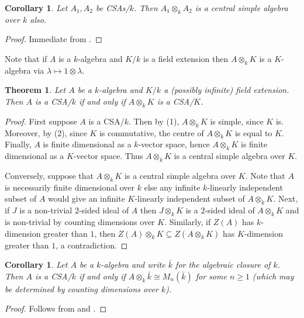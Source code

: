 \documentclass[11pt]{amsart}
\numberwithin{equation}{section}
\newtheorem{theorem}[equation]{Theorem}
\newtheorem{cor}[equation]{Corollary}
\theoremstyle{remark}
\theoremstyle{remark}
\theoremstyle{remark}
\theoremstyle{definition}
\theoremstyle{definition}
\theoremstyle{definition}
\theoremstyle{definition}
\theoremstyle{definition}
\theoremstyle{definition}
\begin{document}
\begin{cor}
Let $A_1,A_2$ be CSAs/$k$. Then $A_1\otimes_k A_2$ is a central simple algebra over $k$ also.
\end{cor}

\begin{proof}
Immediate from .
\end{proof}

Note that if $A$ is a $k$-algebra and $K/k$ is a field extension then $A\otimes_k K$ is a $K$-algebra via $\lambda \mapsto 1\otimes \lambda$.

\begin{theorem} \label{twists of matrix algebra}
Let $A$ be a $k$-algebra and $K/k$ a (possibly infinite) field extension. Then $A$ is a CSA/$k$ if and only if $A\otimes_k K$ is a CSA/$K$.
\end{theorem}

\begin{proof}
First suppose $A$ is a CSA/$k$. Then by  (1), $A\otimes_k K$ is simple, since $K$ is. Moreover, by  (2), since $K$ is commutative, the centre of $A\otimes_k K$ is equal to $K$. Finally, $A$ is finite dimensional as a $k$-vector space, hence $A\otimes _k K$ is finite dimensional as a $K$-vector space. Thus $A\otimes_k K$ is a central simple algebra over $K$.

Conversely, suppose that $A\otimes_k K$ is a central simple algebra over $K$. Note that $A$ is necessarily finite dimensional over $k$ else any infinite $k$-linearly independent subset of $A$ would give an infinite $K$-linearly independent subset of $A\otimes_k K$. Next, if $J$ is a non-trivial $2$-sided ideal of $A$ then $J\otimes_k K$ is a $2$-sided ideal of $A\otimes_k K$ and is non-trivial by counting dimensions over $K$. Similarly, if $Z(A)$ has $k$-dimension greater than $1$, then $Z(A)\otimes_k K\subseteq Z(A\otimes_k K)$ has $K$-dimension greater than $1$, a contradiction. 
\end{proof}

\begin{cor}
Let $A$ be a $k$-algebra and write $\bar{k}$ for the algebraic closure of $k$. Then $A$ is a CSA/$k$ if and only if $A\otimes_k \bar{k}\cong M_n(\bar{k})$ for some $n\geq 1$ (which may be determined by counting dimensions over $k$).
\end{cor}

\begin{proof}
Follows from  and .
\end{proof}
\end{document}

